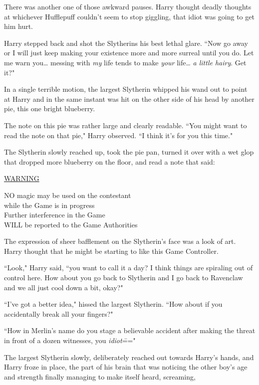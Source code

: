 There was another one of those awkward pauses. Harry thought deadly thoughts at whichever Hufflepuff couldn't seem to stop giggling, that idiot was going to get him hurt.

Harry stepped back and shot the Slytherins his best lethal glare. ``Now go away or I will just keep making your existence more and more surreal until you do. Let me warn you{\ldots} messing with \emph{my} life tends to make \emph{your} life{\ldots} \emph{a little hairy}. Get it?"

In a single terrible motion, the largest Slytherin whipped his wand out to point at Harry and in the same instant was hit on the other side of his head by another pie, this one bright blueberry.

The note on this pie was rather large and clearly readable. ``You might want to read the note on that pie," Harry observed. ``I think it's for you this time."

The Slytherin slowly reached up, took the pie pan, turned it over with a wet glop that dropped more blueberry on the floor, and read a note that said:
\begin{writtenNote}
\begin{samepage}
\MakeUppercase{\underline{Warning}}\nopagebreak[4]

\MakeUppercase{No} magic may be used on the contestant\\
while the Game is in progress\\
Further interference in the Game\\
\MakeUppercase{will} be reported to the Game Authorities
\end{samepage}
\end{writtenNote}

The expression of sheer bafflement on the Slytherin's face was a look of art. Harry thought that he might be starting to like this Game Controller.

``Look," Harry said, ``you want to call it a day? I think things are spiraling out of control here. How about you go back to Slytherin and I go back to Ravenclaw and we all just cool down a bit, okay?"

``I've got a better idea," hissed the largest Slytherin. ``How about if you accidentally break all your fingers?"

``How in Merlin's name do you stage a believable accident after making the threat in front of a dozen witnesses, you \emph{idiot}\==="

The largest Slytherin slowly, deliberately reached out towards Harry's hands, and Harry froze in place, the part of his brain that was noticing the other boy's age and strength finally managing to make itself heard, screaming, 

